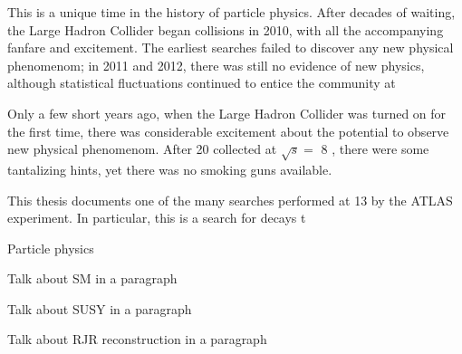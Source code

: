 This is a unique time in the history of particle physics.
After decades of waiting, the Large Hadron Collider began collisions in 2010, with all the accompanying fanfare and excitement.
The earliest searches failed to discover any new physical phenomenom; in 2011 and 2012, there was still no evidence of new physics, although statistical fluctuations continued to entice the community at 

Only a few short years ago, when the Large Hadron Collider was turned on for the first time, there was considerable excitement about the potential to observe new physical phenomenom.
After 20 \ifb collected at $\sqrt{s} = $ 8 \TeV , there were some tantalizing hints, yet there was no smoking guns available.


This thesis documents one of the many searches performed at 13 \TeV by the ATLAS experiment.
In particular, this is a search for decays t

Particle physics 

Talk about SM in a paragraph

Talk about SUSY in a paragraph

Talk about RJR reconstruction in a paragraph